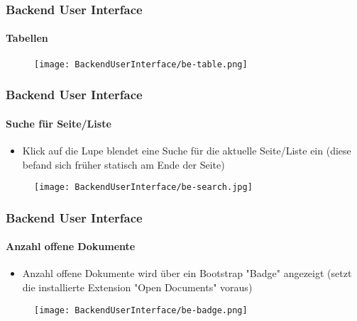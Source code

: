 \begin{frame}[fragile]
	\frametitle{Backend User Interface}
	\framesubtitle{Tabellen}

	\begin{figure}
		\texttt{[image: BackendUserInterface/be-table.png]}
	\end{figure}

\end{frame}


\begin{frame}[fragile]
	\frametitle{Backend User Interface}
	\framesubtitle{Suche für Seite/Liste}

	\begin{itemize}
		\item Klick auf die Lupe blendet eine Suche für die aktuelle Seite/Liste ein\newline
			(diese befand sich früher statisch am Ende der Seite)
	\end{itemize}

	\begin{figure}
		\texttt{[image: BackendUserInterface/be-search.jpg]}
	\end{figure}

\end{frame}


\begin{frame}[fragile]
	\frametitle{Backend User Interface}
	\framesubtitle{Anzahl offene Dokumente}

	\begin{itemize}
		\item Anzahl offene Dokumente wird über ein Bootstrap "Badge" angezeigt\newline
			(setzt die installierte Extension "Open Documents" voraus)
	\end{itemize}
	\begin{figure}
		\texttt{[image: BackendUserInterface/be-badge.png]}
	\end{figure}

\end{frame}

